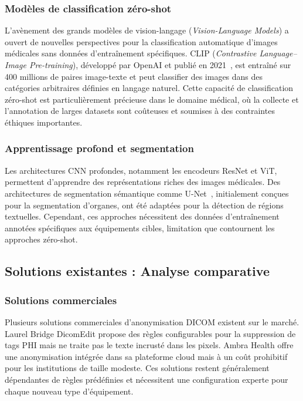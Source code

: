 \subsubsection{Modèles de classification zéro-shot}

L'avènement des grands modèles de vision-langage (\textit{Vision-Language Models}) a ouvert de nouvelles perspectives pour la classification automatique d'images médicales sans données d'entraînement spécifiques. CLIP (\textit{Contrastive Language--Image Pre-training}), développé par OpenAI et publié en 2021~\cite{radford2021clip}, est entraîné sur 400 millions de paires image-texte et peut classifier des images dans des catégories arbitraires définies en langage naturel. Cette capacité de classification zéro-shot est particulièrement précieuse dans le domaine médical, où la collecte et l'annotation de larges datasets sont coûteuses et soumises à des contraintes éthiques importantes.

\subsubsection{Apprentissage profond et segmentation}

Les architectures CNN profondes, notamment les encodeurs ResNet et ViT, permettent d'apprendre des représentations riches des images médicales. Des architectures de segmentation sémantique comme U-Net~\cite{ronneberger2015unet}, initialement conçues pour la segmentation d'organes, ont été adaptées pour la détection de régions textuelles. Cependant, ces approches nécessitent des données d'entraînement annotées spécifiques aux équipements cibles, limitation que contournent les approches zéro-shot.

\subsection{Solutions existantes : Analyse comparative}

\subsubsection{Solutions commerciales}

Plusieurs solutions commerciales d'anonymisation DICOM existent sur le marché. Laurel Bridge DicomEdit propose des règles configurables pour la suppression de tags PHI mais ne traite pas le texte incrusté dans les pixels. Ambra Health offre une anonymisation intégrée dans sa plateforme cloud mais à un coût prohibitif pour les institutions de taille modeste. Ces solutions restent généralement dépendantes de règles prédéfinies et nécessitent une configuration experte pour chaque nouveau type d'équipement.

